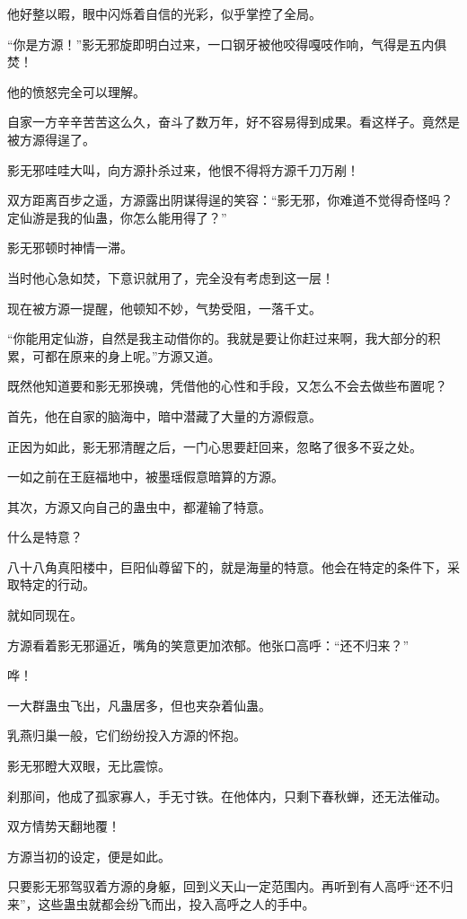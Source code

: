 \begin{this_body}
他好整以暇，眼中闪烁着自信的光彩，似乎掌控了全局。

“你是方源！”影无邪旋即明白过来，一口钢牙被他咬得嘎吱作响，气得是五内俱焚！

他的愤怒完全可以理解。

自家一方辛辛苦苦这么久，奋斗了数万年，好不容易得到成果。看这样子。竟然是被方源得逞了。

影无邪哇哇大叫，向方源扑杀过来，他恨不得将方源千刀万剐！

双方距离百步之遥，方源露出阴谋得逞的笑容：“影无邪，你难道不觉得奇怪吗？定仙游是我的仙蛊，你怎么能用得了？”

影无邪顿时神情一滞。

当时他心急如焚，下意识就用了，完全没有考虑到这一层！

现在被方源一提醒，他顿知不妙，气势受阻，一落千丈。

“你能用定仙游，自然是我主动借你的。我就是要让你赶过来啊，我大部分的积累，可都在原来的身上呢。”方源又道。

既然他知道要和影无邪换魂，凭借他的心性和手段，又怎么不会去做些布置呢？

首先，他在自家的脑海中，暗中潜藏了大量的方源假意。

正因为如此，影无邪清醒之后，一门心思要赶回来，忽略了很多不妥之处。

一如之前在王庭福地中，被墨瑶假意暗算的方源。

其次，方源又向自己的蛊虫中，都灌输了特意。

什么是特意？

八十八角真阳楼中，巨阳仙尊留下的，就是海量的特意。他会在特定的条件下，采取特定的行动。

就如同现在。

方源看着影无邪逼近，嘴角的笑意更加浓郁。他张口高呼：“还不归来？”

哗！

一大群蛊虫飞出，凡蛊居多，但也夹杂着仙蛊。

乳燕归巢一般，它们纷纷投入方源的怀抱。

影无邪瞪大双眼，无比震惊。

刹那间，他成了孤家寡人，手无寸铁。在他体内，只剩下春秋蝉，还无法催动。

双方情势天翻地覆！

方源当初的设定，便是如此。

只要影无邪驾驭着方源的身躯，回到义天山一定范围内。再听到有人高呼“还不归来”，这些蛊虫就都会纷飞而出，投入高呼之人的手中。


\end{this_body}
